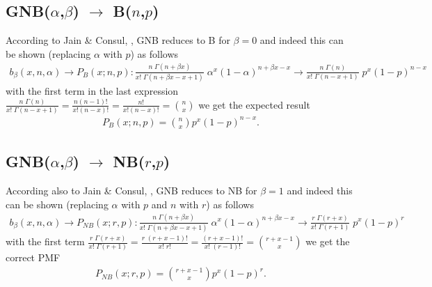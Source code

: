 

\subsection*{GNB($\alpha$,$\beta$) $\rightarrow$ B($n$,$p$)}
According to Jain \& Consul, \cite{jain1971generalized}, GNB reduces to B for $\beta = 0$ and 
indeed this can be shown (replacing $\alpha$ with $p$) as follows
\begin{align*}
 b_{\beta}(x,n,\alpha) \rightarrow P_{B}(x;n,p): %
 \frac{n \; \Gamma(n+\beta x)}{x! \;\Gamma(n + \beta x - x +1)}  \; \alpha^x (1-\alpha)^{n+\beta x-x} \rightarrow 
\frac{n \; \Gamma(n)}{x! \;\Gamma(n - x +1)}  \; p^x (1-p	)^{n-x} 
\end{align*}
with the first term in the last expression $\frac{n \; \Gamma(n)}{x! \;\Gamma(n - x +1)} = \frac{n (n-1)!}{x! (n-x)!} 
= \frac{n!}{x!(n-x)!} = {n \choose x}$ we get the expected result
\begin{align*}
P_{B}(x;n,p) = {n \choose x} p^x (1-p)^{n-x}. %
\end{align*}

\subsection*{GNB($\alpha$,$\beta$) $\rightarrow$ NB($r$,$p$)}
According also to Jain \& Consul, \cite{jain1971generalized}, GNB reduces to NB for $\beta = 1$ and 
indeed this can be shown (replacing $\alpha$ with $p$ and $n$ with $r$) as follows
\begin{align*}
 b_{\beta}(x,n,\alpha) \rightarrow P_{N\!B}(x;r,p):
 \frac{n \; \Gamma(n+\beta x)}{x! \;\Gamma(n + \beta x - x +1)}  \; \alpha^x (1-\alpha)^{n+\beta x-x} \rightarrow 
\frac{r \; \Gamma(r + x)}{x! \;\Gamma(r + 1)}  \; p^x (1-p)^{r} 
\end{align*}
with the first term $\frac{r \; \Gamma(r + x)}{x! \;\Gamma(r + 1)} = \frac{r \; (r + x - 1)!}{x! \;r!} = \frac{(r + x - 1)!}{x! \;(r-1)!}
= {r + x - 1 \choose x}$ we get the correct PMF
\begin{align*}
P_{N\!B}(x;r,p) = {r + x - 1 \choose x} p^x (1-p)^r  .
\end{align*}


